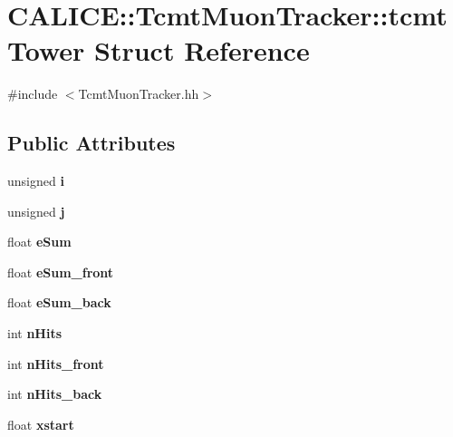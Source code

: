 \section{C\-A\-L\-I\-C\-E\-:\-:Tcmt\-Muon\-Tracker\-:\-:tcmt\-Tower Struct Reference}
\label{structCALICE_1_1TcmtMuonTracker_1_1tcmtTower}


{\ttfamily \#include $<$Tcmt\-Muon\-Tracker.\-hh$>$}

\subsection*{Public Attributes}
\begin{DoxyCompactItemize}
\item 
unsigned {\bfseries i}\label{structCALICE_1_1TcmtMuonTracker_1_1tcmtTower_a81331a658a56eff9d47a9fc0ec9fd9a7}

\item 
unsigned {\bfseries j}\label{structCALICE_1_1TcmtMuonTracker_1_1tcmtTower_aba757f07daad80a7403e5d1e7a55ff6b}

\item 
float {\bfseries e\-Sum}\label{structCALICE_1_1TcmtMuonTracker_1_1tcmtTower_a7cf2bbaeab8749bdb5286dfc7deb2d82}

\item 
float {\bfseries e\-Sum\-\_\-front}\label{structCALICE_1_1TcmtMuonTracker_1_1tcmtTower_a20ffe699f59b5d2b46ad843baaf7cbd7}

\item 
float {\bfseries e\-Sum\-\_\-back}\label{structCALICE_1_1TcmtMuonTracker_1_1tcmtTower_ae2fceb827ddacce2cce32ca81e157115}

\item 
int {\bfseries n\-Hits}\label{structCALICE_1_1TcmtMuonTracker_1_1tcmtTower_aed4e14d0f188329b849d064e980b294a}

\item 
int {\bfseries n\-Hits\-\_\-front}\label{structCALICE_1_1TcmtMuonTracker_1_1tcmtTower_a95f9154793306f4abc35d6bee1e7dc85}

\item 
int {\bfseries n\-Hits\-\_\-back}\label{structCALICE_1_1TcmtMuonTracker_1_1tcmtTower_a025318fe5b7eea301e55fae0d63708de}

\item 
float {\bfseries xstart}\label{structCALICE_1_1TcmtMuonTracker_1_1tcmtTower_a5b04ba3b9ce5de1c95c3b56ed297709c}


\end{DoxyCompactItemize}
